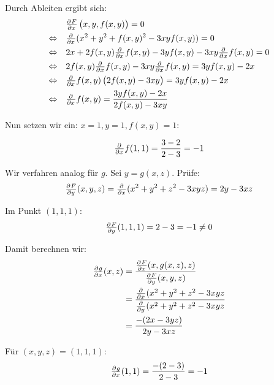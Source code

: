 \documentclass[a4paper,german,12pt,smallheadings]{scrartcl}
\begin{document}
\begin{enumerate}[(1)]
    Durch Ableiten ergibt sich:
    \begin{align*}
                           &\pd{F}{x}\del{x,y,f(x,y)} = 0 \\
      \Leftrightarrow\quad &\pd{}{x}(x^2 + y^2 + f(x,y)^2 - 3xyf(x,y)) = 0 \\
      \Leftrightarrow\quad &2x +2f(x,y) \pd{}{x} f(x,y) - 3y f(x,y) - 3xy \pd{}{x} f(x,y) = 0 \\
      \Leftrightarrow\quad &2f(x,y)\pd{}{x}f(x,y) - 3xy \pd{}{x}f(x,y) = 3yf(x,y) - 2x \\
      \Leftrightarrow\quad &\pd{}{x}f(x,y) \del{2f(x,y) - 3xy} = 3yf(x,y) - 2x \\
      \Leftrightarrow\quad &\pd{}{x}f(x,y) = \frac{3yf(x,y) - 2x}{2f(x,y) - 3xy}
    \end{align*}

    Nun setzen wir ein: $x=1, y=1, f(x,y) = 1$:

    \begin{align*}
      \pd{}{x} f(1,1) = \frac{3-2}{2-3} = -1
    \end{align*}

    Wir verfahren analog für $g$. Sei $y = g(x,z)$. Prüfe:
    \begin{align*}
      \pd{F}{y}(x,y,z) = \pd{}{x}(x^2 + y^2+z^2-3xyz) = 2y-3xz
    \end{align*}

    Im Punkt $(1,1,1)$:
    \begin{align*}
      \pd{F}{y}(1,1,1) = 2-3 = -1 \neq 0
    \end{align*}

    Damit berechnen wir:
    \begin{align*}
      \pd{g}{x}(x,z) &= \frac{\pd{F}{x}(x, g(x,z), z)}{\pd{F}{y}(x,y,z)} \\
                     &= \frac{\pd{}{x}(x^2+y^2+z^2 - 3xyz}{\pd{}{y} (x^2+y^2+z^2 - 3xyz} \\
                     &= \frac{-(2x-3yz)}{2y - 3xz}
    \end{align*}

    Für $(x,y,z) = (1,1,1)$:
    \begin{align*}
      \pd{g}{x}(1,1) = \frac{-(2-3)}{2-3} = -1
    \end{align*}
\end{enumerate}
\end{document}
